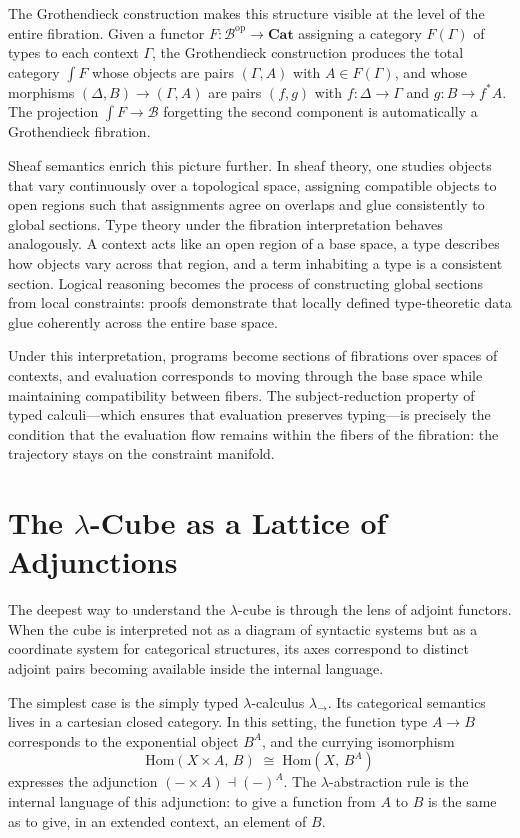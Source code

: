 \documentclass[12pt,a4paper]{article}
\theoremstyle{plain}
\theoremstyle{definition}
\newcommand{\B}{\mathcal{B}}
\newcommand{\Hom}{\mathrm{Hom}}
\newcommand{\op}{\mathrm{op}}
\begin{document}
The Grothendieck construction makes this structure visible at the level of the entire fibration. Given a functor $F : \B^\op \to \mathbf{Cat}$ assigning a category $F(\Gamma)$ of types to each context $\Gamma$, the Grothendieck construction produces the total category $\int F$ whose objects are pairs $(\Gamma, A)$ with $A \in F(\Gamma)$, and whose morphisms $(\Delta, B) \to (\Gamma, A)$ are pairs $(f, g)$ with $f : \Delta \to \Gamma$ and $g : B \to f^* A$. The projection $\int F \to \B$ forgetting the second component is automatically a Grothendieck fibration.

Sheaf semantics enrich this picture further. In sheaf theory, one studies objects that vary continuously over a topological space, assigning compatible objects to open regions such that assignments agree on overlaps and glue consistently to global sections. Type theory under the fibration interpretation behaves analogously. A context acts like an open region of a base space, a type describes how objects vary across that region, and a term inhabiting a type is a consistent section. Logical reasoning becomes the process of constructing global sections from local constraints: proofs demonstrate that locally defined type-theoretic data glue coherently across the entire base space.

Under this interpretation, programs become sections of fibrations over spaces of contexts, and evaluation corresponds to moving through the base space while maintaining compatibility between fibers. The subject-reduction property of typed calculi---which ensures that evaluation preserves typing---is precisely the condition that the evaluation flow remains within the fibers of the fibration: the trajectory stays on the constraint manifold.

\section{The $\lambda$-Cube as a Lattice of Adjunctions}

The deepest way to understand the $\lambda$-cube is through the lens of adjoint functors. When the cube is interpreted not as a diagram of syntactic systems but as a coordinate system for categorical structures, its axes correspond to distinct adjoint pairs becoming available inside the internal language.

The simplest case is the simply typed $\lambda$-calculus $\lambda_\to$. Its categorical semantics lives in a cartesian closed category. In this setting, the function type $A \to B$ corresponds to the exponential object $B^A$, and the currying isomorphism
\[
\Hom(X \times A,\, B) \;\cong\; \Hom(X,\, B^A)
\]
expresses the adjunction $(- \times A) \dashv (-)^A$. The $\lambda$-abstraction rule is the internal language of this adjunction: to give a function from $A$ to $B$ is the same as to give, in an extended context, an element of $B$.
\end{document}
